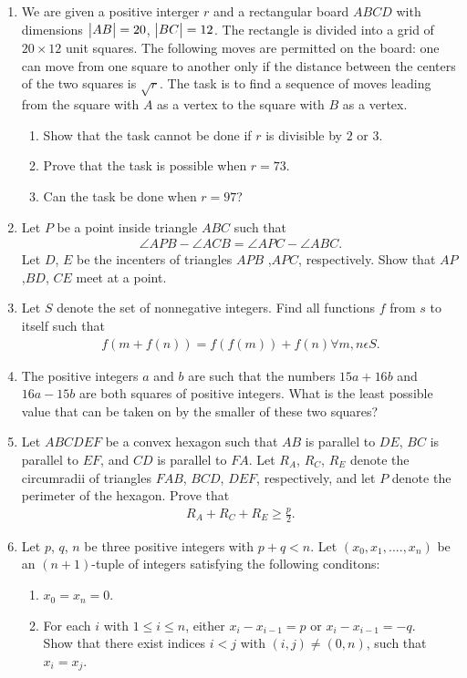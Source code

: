 \documentclass{article}
\begin{document}
\begin{enumerate}
\item  We are given a positive interger $r$ and a rectangular board $ABCD$ with dimensions $\begin{vmatrix}AB\end{vmatrix} =20$, $\begin{vmatrix}BC\end{vmatrix}=12$. The rectangle is divided into a grid of $20\times12$ unit squares. The following moves are permitted on the board: one can move from one square to another only if the distance between the centers of the two squares is $\sqrt{r}$. The task is to find a sequence of moves leading from the square with $A$ as a vertex to the square with $B$ as a vertex.
\begin{enumerate}
\item Show that the task cannot be done if $r$ is divisible by $2$ or $3$.
\item Prove that the task is possible when $r=73$.
\item Can the task be done when $r=97$?
\end{enumerate}
\item Let $P$ be a point inside triangle $ABC$ such that
\begin{align}
\angle{APB}-\angle{ACB}=\angle{APC}-\angle{ABC}.
\end{align}
Let $D$, $E$ be the incenters of triangles $APB$ ,$APC$, respectively. Show that $AP$ ,$BD$, $CE$ meet at a point.
\item Let $S$ denote the set of nonnegative integers. Find all functions $f$ from $s$ to itself such that 
\begin{align}
f(m+f(n))=f(f(m))+f(n)         
\forall{m}, n \epsilon S. 
\end{align}
\item The positive integers $a$ and $b$ are such that the numbers $15a+16b$ and $16a-15b$ are both squares of positive integers. What is the least possible value that can be taken on by the smaller of these two squares?
\item Let $ABCDEF$ be a convex hexagon such that $AB$ is parallel to $DE$, $BC$ is parallel to $EF$, and $CD$ is parallel to $FA$. Let $R_A$, $R_C$, $R_E$ denote the circumradii of triangles $FAB$, $BCD$, $DEF$, respectively, and let $P$ denote the perimeter of the hexagon. Prove that
\begin{align}
R_A+R_C+R_E\geq\frac{p}{2}.
\end{align}
\item Let $p$, $q$, $n$ be three positive integers with $p+q<n$. Let $(x_0, x_1,....,x_n)$ be an $(n+1)$-tuple of integers satisfying the following conditons:
\begin{enumerate}
\item $x_0=x_n=0$.
\item For each $i$ with $1\leq{i}\leq{n}$, either $x_i-x_{i-1}=p$ or $x_i-x_{i-1}=-q$.\\ 
Show that there exist indices $i < j$ with $(i,j) \neq(0,n)$, such that $x_i=x_j$.
\end{enumerate}
\end{enumerate}
\end{document}
